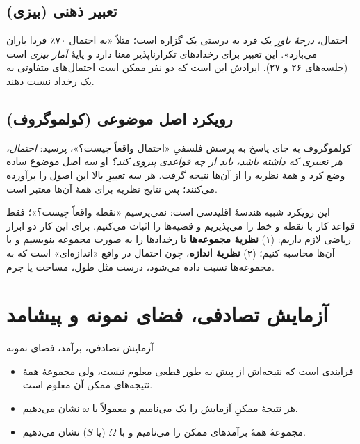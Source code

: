 \subsection{تعبیر ذهنی (بیزی)}
احتمال، \emph{درجهٔ باورِ} یک فرد به درستی یک گزاره است؛ مثلاً «به احتمال ۷۰٪ فردا باران می‌بارد». این تعبیر برای رخدادهای تکرارناپذیر معنا دارد و پایهٔ \emph{آمار بیزی} است (جلسه‌های ۲۶ و ۲۷). ایرادش این است که دو نفر ممکن است احتمال‌های متفاوتی به یک رخداد نسبت دهند.

\subsection{رویکرد اصل موضوعی (کولموگروف)}

کولموگروف به جای پاسخ به پرسش فلسفیِ «احتمال واقعاً چیست؟»، پرسید: \emph{احتمال، هر تعبیری که داشته باشد، باید از چه قواعدی پیروی کند؟} او سه اصل موضوع ساده وضع کرد و همهٔ نظریه را از آن‌ها نتیجه گرفت. هر سه تعبیرِ بالا این اصول را برآورده می‌کنند؛ پس نتایج نظریه برای همهٔ آن‌ها معتبر است.

\begin{intuition}
این رویکرد شبیه هندسهٔ اقلیدسی است: نمی‌پرسیم «نقطه واقعاً چیست؟»؛ فقط قواعد کار با نقطه و خط را می‌پذیریم و قضیه‌ها را اثبات می‌کنیم. برای این کار دو ابزار ریاضی لازم داریم:
(۱) \textbf{نظریهٔ مجموعه‌ها} تا رخدادها را به صورت مجموعه بنویسیم و با آن‌ها محاسبه کنیم؛
(۲) \textbf{نظریهٔ اندازه}، چون احتمال در واقع «اندازه‌ای» است که به مجموعه‌ها نسبت داده می‌شود، درست مثل طول، مساحت یا جرم.
\end{intuition}

\section{آزمایش تصادفی، فضای نمونه و پیشامد}

\begin{definition}{آزمایش تصادفی، برآمد، فضای نمونه}
\begin{itemize}
  \item {} فرایندی است که نتیجه‌اش از پیش به طور قطعی معلوم نیست، ولی مجموعهٔ همهٔ نتیجه‌های ممکن آن معلوم است.
  \item هر نتیجهٔ ممکنِ آزمایش را یک  می‌نامیم و معمولاً با $\omega$ نشان می‌دهیم.
  \item مجموعهٔ همهٔ برآمدهای ممکن را  می‌نامیم و با $\Omega$ (یا $S$) نشان می‌دهیم.
\end{itemize}
\end{definition}

